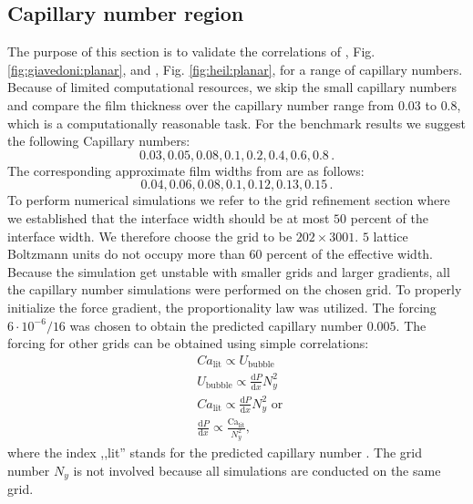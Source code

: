\documentclass{article}
\newcommand{\Ca}{\mathrm{Ca}}
\begin{document}
\subsection{Capillary number region}
The purpose of this section is to validate the correlations of
\citet{giavedoni-numerical}, Fig. \ref{fig:giavedoni:planar}, and
\citet{heil-bretherton}, Fig. \ref{fig:heil:planar}, for a range of capillary
numbers. Because of limited computational resources, we skip the
small capillary numbers and compare the film thickness over the capillary number
range from $0.03$ to $0.8$, which is a computationally reasonable task.  For the
benchmark
results we
suggest the following Capillary numbers:
\begin{equation}
0.03,0.05,0.08,0.1,0.2,0.4,0.6,0.8\, .
\end{equation}
The corresponding approximate film widths from \cite{giavedoni-numerical} are as
follows:
\begin{equation}
0.04,0.06,0.08,0.1,0.12,0.13,0.15\,.
\end{equation}
To perform numerical simulations we refer
to the grid refinement section where we established that the interface width should be
at most $50$ percent of the interface width.  We therefore choose the grid to be
$202 \times 3001$. $5$ lattice Boltzmann units do not occupy more than $60$
percent of the effective width. Because the simulation get unstable with
smaller grids and larger gradients, all the capillary number simulations were
performed on the chosen grid. To properly initialize the force gradient, the
proportionality law was utilized. The forcing
$6 \cdot 10^{-6}/16$ was chosen to obtain the predicted capillary
number $0.005$. The forcing for other grids can be obtained using
simple correlations:
\begin{equation}
\begin{aligned}
&Ca_{\mathrm{lit}} \propto U_{\mathrm{bubble}}\\
&U_{\mathrm{bubble}} \propto \frac{\mathrm{d}P}{\mathrm{d}x} N_y^2\\
&Ca_{\mathrm{lit}} \propto \frac{\mathrm{d}P}{\mathrm{d} x} N_y^2 \text{ or }\\
&\frac{\mathrm{d}P}{\mathrm{d} x} \propto \frac{\Ca_{\mathrm{lit}}}{N_y^2},
\end{aligned}
\end{equation}
where the index ,,lit'' stands for the predicted capillary number
\cite{giavedoni-numerical,heil-bretherton}. The grid number $N_y$ is not
involved because all simulations are conducted on the same grid.
\end{document}
